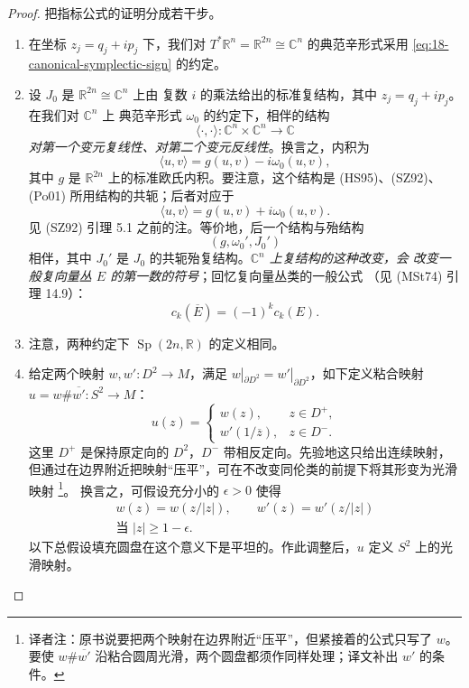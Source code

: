 \begin{proof}
把指标公式的证明分成若干步。

\begin{enumerate}[label=\arabic*.]
\item {} 在坐标 $z_j=q_j+ip_j$ 下，我们对
$T^*\mathbb R^n=\mathbb R^{2n}\cong\mathbb C^n$ 的典范辛形式采用
\eqref{eq:18-canonical-symplectic-sign} 的约定。

\item {} 设 $J_0$ 是 $\mathbb R^{2n}\cong\mathbb C^n$ 上由
复数 $i$ 的乘法给出的标准复结构，其中 $z_j=q_j+ip_j$。在我们对 $\mathbb C^n$ 上
典范辛形式 $\omega_0$ 的约定下，相伴的\personHermitian{}结构
\[
 \langle\cdot,\cdot\rangle:\mathbb C^n\times\mathbb C^n\longrightarrow\mathbb C
\]
\emph{对第一个变元复线性、对第二个变元反线性}。换言之，\personHermitian{}内积为
\begin{equation}
 \langle u,v\rangle=g(u,v)-i\omega_0(u,v),
 \label{eq:18-hermitian-our-convention}
\end{equation}
其中 $g$ 是 $\mathbb R^{2n}$ 上的标准欧氏内积。要注意，这个\personHermitian{}结构是
(HS95)、(SZ92)、(Po01) 所用结构的共轭；后者对应于
\begin{equation}
 \langle u,v\rangle=g(u,v)+i\omega_0(u,v).
 \label{eq:18-hermitian-other-convention}
\end{equation}
见 (SZ92) 引理 5.1 之前的注。等价地，后一个\personHermitian{}结构与殆\personKahler{}结构
\[
 (g,\omega_0',J_0')
\]
相伴，其中 $J_0'$ 是 $J_0$ 的共轭殆复结构。\emph{$\mathbb C^n$ 上复结构的这种改变，会
改变一般复向量丛 $E$ 的第一\personChern{}数的符号}；回忆复向量丛\personChern{}类的一般公式
（见 (MSt74) 引理 14.9）：
\[
 c_k(\overline E)=(-1)^kc_k(E).
\]

\item {}
注意，两种约定下 $\operatorname{Sp}(2n,\mathbb R)$ 的定义相同。

\item 给定两个映射 $w,w':D^2\to M$，满足
$w|_{\partial D^2}=w'|_{\partial D^2}$，如下定义粘合映射
$u=w\#\overline{w'}:S^2\to M$：
\[
 u(z)=\begin{cases}
  w(z),&z\in D^+,\\
  w'(1/\overline z),&z\in D^-.
 \end{cases}
\]
这里 $D^+$ 是保持原定向的 $D^2$，$D^-$ 带相反定向。先验地这只给出连续映射，
但通过在边界附近把映射“压平”，可在不改变同伦类的前提下将其形变为光滑映射
\footnote{译者注：原书说要把两个映射在边界附近“压平”，但紧接着的公式只写了
$w$。要使 $w\#\overline{w'}$ 沿粘合圆周光滑，两个圆盘都须作同样处理；译文补出
$w'$ 的条件。}。
换言之，可假设充分小的 $\epsilon>0$ 使得
\[
 \begin{gathered}
 w(z)=w(z/|z|),\qquad w'(z)=w'(z/|z|)\\
 \text{当 }|z|\geq1-\epsilon.
 \end{gathered}
\]
以下总假设填充圆盘在这个意义下是平坦的。作此调整后，$u$ 定义 $S^2$ 上的光滑映射。


\end{enumerate}
\end{proof}

